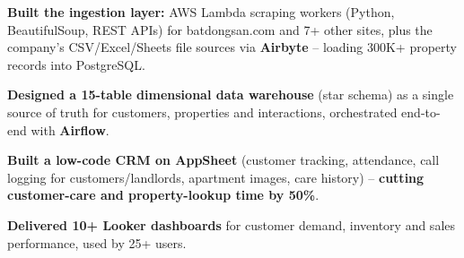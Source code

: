 
\vspace{1pt}
\begin{resume_list}
  \item \textbf{Built the ingestion layer:} AWS Lambda scraping workers (Python, BeautifulSoup, REST APIs) for batdongsan.com and 7+ other sites, plus the company's CSV/Excel/Sheets file sources via \textbf{Airbyte} -- loading 300K+ property records into PostgreSQL.
  \item \textbf{Designed a 15-table dimensional data warehouse} (star schema) as a single source of truth for customers, properties and interactions, orchestrated end-to-end with \textbf{Airflow}.
  \item \textbf{Built a low-code CRM on AppSheet} (customer tracking, attendance, call logging for customers/landlords, apartment images, care history) -- \textbf{cutting customer-care and property-lookup time by 50\%}.
  \item \textbf{Delivered 10+ Looker dashboards} for customer demand, inventory and sales performance, used by 25+ users.
\end{resume_list}
